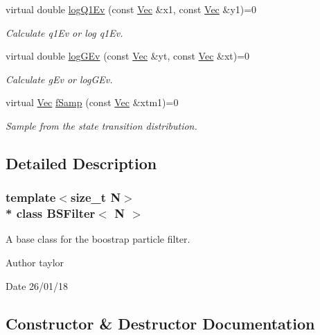 \begin{DoxyCompactItemize}
virtual double \hyperlink{classBSFilter_a9a50ae948bee94114567ca798c8e6f1f}{log\+Q1\+Ev} (const \hyperlink{apf__filter_8h_a4c7df05c6f5e8a0d15ae14bcdbc07152}{Vec} \&x1, const \hyperlink{apf__filter_8h_a4c7df05c6f5e8a0d15ae14bcdbc07152}{Vec} \&y1)=0
\begin{DoxyCompactList}\small\item\em Calculate q1\+Ev or log q1\+Ev. \end{DoxyCompactList}\item 
virtual double \hyperlink{classBSFilter_ae7ee72e08ab3c0e6ae66f3210a0f18d4}{log\+G\+Ev} (const \hyperlink{apf__filter_8h_a4c7df05c6f5e8a0d15ae14bcdbc07152}{Vec} \&yt, const \hyperlink{apf__filter_8h_a4c7df05c6f5e8a0d15ae14bcdbc07152}{Vec} \&xt)=0
\begin{DoxyCompactList}\small\item\em Calculate g\+Ev or log\+G\+Ev. \end{DoxyCompactList}\item 
virtual \hyperlink{apf__filter_8h_a4c7df05c6f5e8a0d15ae14bcdbc07152}{Vec} \hyperlink{classBSFilter_a3d4caf998045f89a6887c3113c5c38f9}{f\+Samp} (const \hyperlink{apf__filter_8h_a4c7df05c6f5e8a0d15ae14bcdbc07152}{Vec} \&xtm1)=0
\begin{DoxyCompactList}\small\item\em Sample from the state transition distribution. \end{DoxyCompactList}\end{DoxyCompactItemize}


\subsection{Detailed Description}
\subsubsection*{template$<$size\+\_\+t N$>$\\*
class B\+S\+Filter$<$ N $>$}

A base class for the boostrap particle filter. 

\begin{DoxyAuthor}{Author}
taylor 
\end{DoxyAuthor}
\begin{DoxyDate}{Date}
26/01/18 
\end{DoxyDate}


\subsection{Constructor \& Destructor Documentation}
